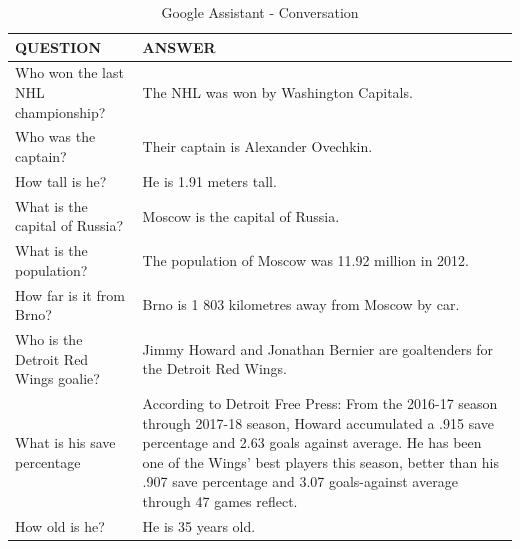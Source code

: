 \documentclass[
  digital, %
  oneside, %
  table,   %
  lof,     %
  lot,     %
]{fithesis3}
\begin{document}
\begin{table}[H]
    \begin{tabular}{ | p{6cm} | p{6cm} |} 
    \hline
    QUESTION & ANSWER \\
    \hline
    Who won the last NHL championship?
    & 
    The NHL was won by Washington Capitals.
    \\
    Who was the captain?
    &
    Their captain is Alexander Ovechkin.
    \\
    How tall is he?
    &
    He is 1.91 meters tall.
    \\
    \hline
    What is the capital of Russia?
    &
    Moscow is the capital of Russia.
    \\
    What is the population?
    &
    The population of Moscow was 11.92 million in 2012.
    \\
    How far is it from Brno?
    & 
    Brno is 1 803 kilometres away from Moscow by car.
    \\
    \hline
    Who is the Detroit Red Wings goalie?
    &
    Jimmy Howard and Jonathan Bernier are goaltenders for the Detroit Red Wings.
    \\
    What is his save percentage
    &
    According to Detroit Free Press:
    \newline
    From the 2016-17 season through 2017-18 season, Howard accumulated a .915 save percentage and 2.63 goals against average.
    \newline
    He has been one of the Wings' best players this season, better than his .907 save percentage and 3.07 goals-against average through 47 games reflect.
    \\
    How old is he?
    & 
    He is 35 years old.
    \\
    \hline
    \end{tabular}
    \caption{Google Assistant - Conversation}
    \label{tab:google_conversation}
\end{table}
\end{document}
